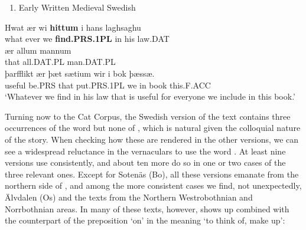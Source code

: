 \begin{enumerate} %
\item 
Early Written Medieval Swedish

\end{enumerate} %
\ea\label{}
\gll Hwat  ær  wi  \textbf{hittum} i  hans  laghsaghu\\


what  ever  we  \textbf{find.PRS.1PL} in  his  law.DAT\\ %


\ea\label{}
\gll ær  allum  mannum\\


that  all.DAT.PL  man.DAT.PL\\ %


\ea\label{}
\gll þarfflikt  ær  þæt  sætium  wir  i  bok  þæssæ.\\


useful  be.PRS  that  put.PRS.1PL  we  in  book  this.F.ACC\\ %


‘Whatever we find in his law that is useful for everyone we include in this book.’
\z


Turning now to the Cat Corpus, the Swedish version of the text contains three occurrences of the word  but none of , which is natural given the colloquial nature of the story. When checking how these are rendered in the other versions, we can see a widespread reluctance in the vernaculars to use the word . At least nine versions use  consistently, and about ten more do so in one or two cases of the three relevant ones. Except for Sotenäs (Bo), all these versions emanate from the northern side of , and among the more consistent cases we find, not unexpectedly, Älvdalen (Os) and the texts from the Northern Westrobothnian and Norrbothnian areas. In many of these texts, however,  shows up combined with the counterpart of the preposition  ‘on’ in the meaning ‘to think of, make up’:

